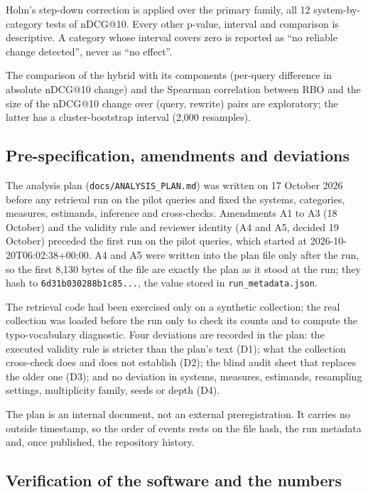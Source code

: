 \documentclass[
  11pt,
]{article}
\begin{document}
Holm's step-down correction \citep{holm1979} is applied over the primary
family, all 12 system-by-category tests of nDCG@10. Every other p-value,
interval and comparison is descriptive. A category whose interval covers
zero is reported as ``no reliable change detected'', never as ``no
effect''.

The comparison of the hybrid with its components (per-query difference
in absolute nDCG@10 change) and the Spearman correlation between RBO and
the size of the nDCG@10 change over (query, rewrite) pairs are
exploratory; the latter has a cluster-bootstrap interval (2,000
resamples).

\hypertarget{pre-specification-amendments-and-deviations}{%
\subsection{Pre-specification, amendments and
deviations}\label{pre-specification-amendments-and-deviations}}

The analysis plan (\texttt{docs/ANALYSIS\_PLAN.md}) was written on 17
October 2026 before any retrieval run on the pilot queries and fixed the
systems, categories, measures, estimands, inference and cross-checks.
Amendments A1 to A3 (18 October) and the validity rule and reviewer
identity (A4 and A5, decided 19 October) preceded the first run on the
pilot queries, which started at 2026-10-20T06:02:38+00:00. A4 and A5
were written into the plan file only after the run, so the first 8,130
bytes of the file are exactly the plan as it stood at the run; they hash
to \texttt{6d31b030288b1c85...}, the value stored in
\texttt{run\_metadata.json}.

The retrieval code had been exercised only on a synthetic collection;
the real collection was loaded before the run only to check its counts
and to compute the typo-vocabulary diagnostic. Four deviations are
recorded in the plan: the executed validity rule is stricter than the
plan's text (D1); what the collection cross-check does and does not
establish (D2); the blind audit sheet that replaces the older one (D3);
and no deviation in systems, measures, estimands, resampling settings,
multiplicity family, seeds or depth (D4).

The plan is an internal document, not an external preregistration. It
carries no outside timestamp, so the order of events rests on the file
hash, the run metadata and, once published, the repository history.

\hypertarget{verification-of-the-software-and-the-numbers}{%
\subsection{Verification of the software and the
numbers}\label{verification-of-the-software-and-the-numbers}}
\end{document}
